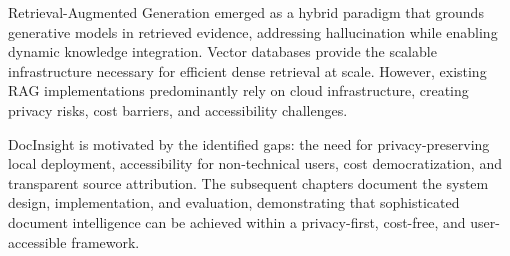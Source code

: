Retrieval-Augmented Generation emerged as a hybrid paradigm that grounds generative models in retrieved evidence, addressing hallucination while enabling dynamic knowledge integration. Vector databases provide the scalable infrastructure necessary for efficient dense retrieval at scale. However, existing RAG implementations predominantly rely on cloud infrastructure, creating privacy risks, cost barriers, and accessibility challenges.

DocInsight is motivated by the identified gaps: the need for privacy-preserving local deployment, accessibility for non-technical users, cost democratization, and transparent source attribution. The subsequent chapters document the system design, implementation, and evaluation, demonstrating that sophisticated document intelligence can be achieved within a privacy-first, cost-free, and user-accessible framework.